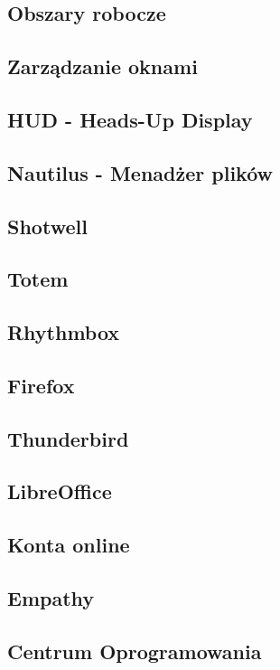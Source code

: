 \documentclass[a4paper,11pt,oneside]{mwart}
\begin{document}
        	\subsection{Obszary robocze}
        		
        	\subsection{Zarządzanie oknami}
        		
        \subsection{HUD - Heads-Up Display}
    		    	
        \subsection{Nautilus - Menadżer plików}
			        
        \subsection{Shotwell}
        \subsection{Totem}
        \subsection{Rhythmbox}
        \subsection{Firefox}
        \subsection{Thunderbird}
        \subsection{LibreOffice}
        \subsection{Konta online}
        \subsection{Empathy}
        \subsection{Centrum Oprogramowania}
\end{document}
